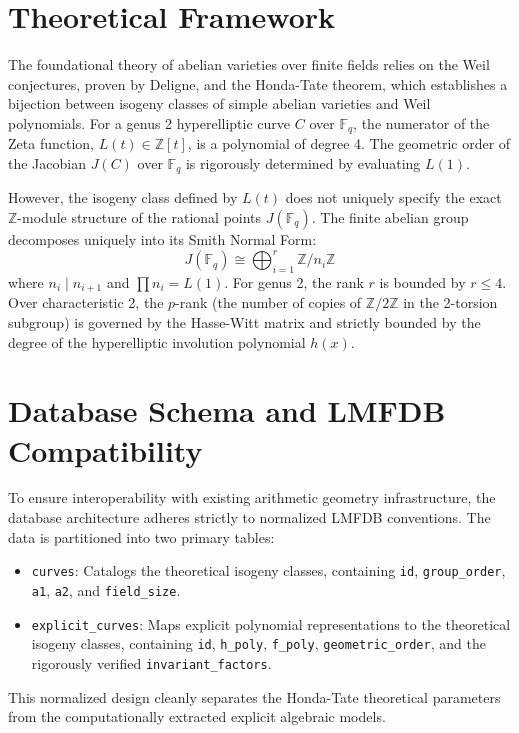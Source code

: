 \documentclass[letterpaper, 11pt]{article}
\begin{document}
\section{Theoretical Framework}
The foundational theory of abelian varieties over finite fields relies on the Weil conjectures, proven by Deligne, and the Honda-Tate theorem, which establishes a bijection between isogeny classes of simple abelian varieties and Weil polynomials. For a genus 2 hyperelliptic curve $C$ over $\mathbb{F}_q$, the numerator of the Zeta function, $L(t) \in \mathbb{Z}[t]$, is a polynomial of degree 4. The geometric order of the Jacobian $J(C)$ over $\mathbb{F}_q$ is rigorously determined by evaluating $L(1)$.

However, the isogeny class defined by $L(t)$ does not uniquely specify the exact $\mathbb{Z}$-module structure of the rational points $J(\mathbb{F}_q)$. The finite abelian group decomposes uniquely into its Smith Normal Form:
\begin{equation}
    J(\mathbb{F}_q) \cong \bigoplus_{i=1}^r \mathbb{Z}/n_i\mathbb{Z}
\end{equation}
where $n_i \mid n_{i+1}$ and $\prod n_i = L(1)$. For genus 2, the rank $r$ is bounded by $r \le 4$. Over characteristic 2, the $p$-rank (the number of copies of $\mathbb{Z}/2\mathbb{Z}$ in the 2-torsion subgroup) is governed by the Hasse-Witt matrix and strictly bounded by the degree of the hyperelliptic involution polynomial $h(x)$.

\section{Database Schema and LMFDB Compatibility}
To ensure interoperability with existing arithmetic geometry infrastructure, the database architecture adheres strictly to normalized LMFDB conventions. The data is partitioned into two primary tables:

\begin{itemize}
    \item \texttt{curves}: Catalogs the theoretical isogeny classes, containing \texttt{id}, \texttt{group\_order}, \texttt{a1}, \texttt{a2}, and \texttt{field\_size}.
    \item \texttt{explicit\_curves}: Maps explicit polynomial representations to the theoretical isogeny classes, containing \texttt{id}, \texttt{h\_poly}, \texttt{f\_poly}, \texttt{geometric\_order}, and the rigorously verified \texttt{invariant\_factors}.
\end{itemize}
This normalized design cleanly separates the Honda-Tate theoretical parameters from the computationally extracted explicit algebraic models.
\end{document}
